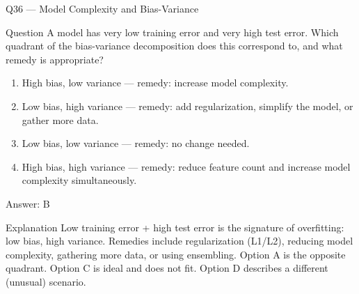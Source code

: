 \documentclass[aspectratio=169,8pt]{beamer}
\begin{document}
	\begin{frame}{Q36 --- Model Complexity and Bias-Variance}
		\begin{block}{Question}
			A model has very low training error and very high test error. Which quadrant of the bias-variance decomposition does this correspond to, and what remedy is appropriate?
		\end{block}
		\begin{enumerate}
			\item High bias, low variance --- remedy: increase model complexity.
			\item Low bias, high variance --- remedy: add regularization, simplify the model, or gather more data.
			\item Low bias, low variance --- remedy: no change needed.
			\item High bias, high variance --- remedy: reduce feature count and increase model complexity simultaneously.
		\end{enumerate}
		\begin{exampleblock}{Answer: B}\end{exampleblock}
		\begin{block}{Explanation}
			Low training error + high test error is the signature of overfitting: low bias, high variance. Remedies include regularization (L1/L2), reducing model complexity, gathering more data, or using ensembling. Option A is the opposite quadrant. Option C is ideal and does not fit. Option D describes a different (unusual) scenario.
		\end{block}
	\end{frame}
	
\end{document}
